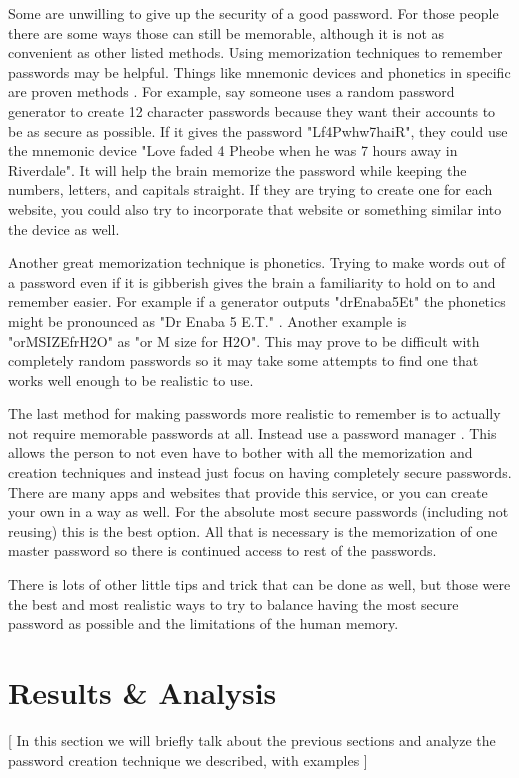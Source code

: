 \documentclass[acmsmall,nonacm]{acmart}
\begin{document}
Some are unwilling to give up the security of a good password. For those people there are some ways those can still be memorable, although it is not as convenient as other listed methods. Using memorization techniques to remember passwords may be helpful. Things like mnemonic devices and phonetics in specific are proven methods \cite{rubenking_2021}. For example, say someone uses a random password generator to create 12 character passwords because they want their accounts to be as secure as possible. If it gives the password "Lf4Pwhw7haiR", they could use the mnemonic device "Love faded 4 Pheobe when he was 7 hours away in Riverdale". It will help the brain memorize the password while keeping the numbers, letters, and capitals straight. If they are trying to create one for each website, you could also try to incorporate that website or something similar into the device as well.


Another great memorization technique is phonetics. Trying to make words out of a password even if it is gibberish gives the brain a familiarity to hold on to and remember easier. For example if a generator outputs "drEnaba5Et" the phonetics might be pronounced as "Dr Enaba 5 E.T." \cite{rubenking_2021}. Another example is "orMSIZEfrH2O" as "or M size for H2O". This may prove to be difficult with completely random passwords so it may take some attempts to find one that works well enough to be realistic to use.


The last method for making passwords more realistic to remember is to actually not require memorable passwords at all. Instead use a password manager \cite{lee_2014}. This allows the person to not even have to bother with all the memorization and creation techniques and instead just focus on having completely secure passwords. There are many apps and websites that provide this service, or you can create your own in a way as well. For the absolute most secure passwords (including not reusing) this is the best option. All that is necessary is the memorization of one master password so there is continued access to rest of the passwords.


There is lots of other little tips and trick that can be done as well, but those were the best and most realistic ways to try to balance having the most secure password as possible and the limitations of the human memory.

\section{Results \& Analysis}
\textcolor{beaver}{[ In this section we will briefly talk about the previous sections and analyze the password creation technique we described, with examples ]} 
\end{document}
